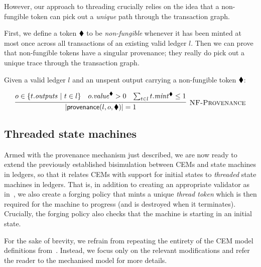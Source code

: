 However, our approach to threading crucially relies on the idea that a
non-fungible token can pick out a \emph{unique} path through the
transaction graph.

First, we define a token $\blacklozenge$ to be \textit{non-fungible} whenever
it has been minted at most once across all transactions of an existing
valid ledger $l$.
Then we can prove that non-fungible tokens have a singular provenance;
they really do pick out a unique trace through the transaction graph.

\begin{proposition}
Given a valid ledger $l$ and an unspent output carrying a non-fungible
token $\blacklozenge$:

\begin{displaymath}
\infer[\textsc{NF-Provenance}]
  {|\provenance(l, o, \nft)| = 1}
  {%
    o \in \{ t.\outputs \ | \ t \in l \}
  & o.\val^\nft > 0
  & \sum_{t \in l} t.\mint^\nft \leq 1
  }
\end{displaymath}
\end{proposition}

\subsection{Threaded state machines}

Armed with the provenance mechanism just described, we are now ready
to extend the previously established bisimulation between CEMs and
state machines in ledgers, so that it relates CEMs with support for
initial states to \textit{threaded} state machines in ledgers.  That
is, in addition to creating an appropriate validator as
in~\cite{eutxo-1-paper}, we also create a forging policy that mints
a unique \textit{thread token} which is then required for the
machine to progress (and is destroyed when it terminates).  Crucially,
the forging policy also checks that the machine is starting in an
initial state.

For the sake of brevity, we refrain from repeating the entirety of
the CEM model definitions from~\cite{eutxo-1-paper}.
Instead, we focus only on the relevant modifications and refer
the reader to the mechanised model for more details.

